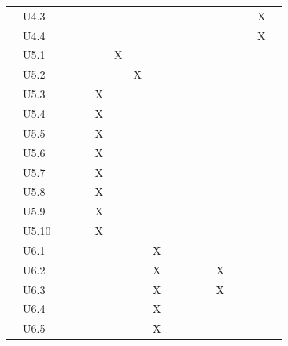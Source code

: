 \documentclass[hidelinks, 12pt, a4paper]{article}
\begin{document}
\begin{table}[H]
\begin{tabular}{|l|l|l|c|c|c|c|c|c|c|c|c|c|c|c|c|c|c|}
             & U4.3  &    &    &    &    &    &    &    &    &    &     &     &     &     &     & X   \\ \cline{2-17}
             & U4.4  &    &    &    &    &    &    &    &    &    &     &     &     &     &     & X   \\ \cline{2-17}
             & U5.1  &    &    &    &    & X  &    &    &    &    &     &     &     &     &     &     \\ \cline{2-17}
             & U5.2  &    &    &    &    &    & X  &    &    &    &     &     &     &     &     &     \\ \cline{2-17}
             & U5.3  &    &    &    & X  &    &    &    &    &    &     &     &     &     &     &     \\ \cline{2-17}
             & U5.4  &    &    &    & X  &    &    &    &    &    &     &     &     &     &     &     \\ \cline{2-17}
             & U5.5  &    &    &    & X  &    &    &    &    &    &     &     &     &     &     &     \\ \cline{2-17}
             & U5.6  &    &    &    & X  &    &    &    &    &    &     &     &     &     &     &     \\ \cline{2-17}
             & U5.7  &    &    &    & X  &    &    &    &    &    &     &     &     &     &     &     \\ \cline{2-17}
             & U5.8  &    &    &    & X  &    &    &    &    &    &     &     &     &     &     &     \\ \cline{2-17}
             & U5.9  &    &    &    & X  &    &    &    &    &    &     &     &     &     &     &     \\ \cline{2-17}
             & U5.10 &    &    &    & X  &    &    &    &    &    &     &     &     &     &     &     \\ \cline{2-17}
             & U6.1  &    &    &    &    &    &    & X  &    &    &     &     &     &     &     &     \\ \cline{2-17}
             & U6.2  &    &    &    &    &    &    & X  &    &    &     &     & X   &     &     &     \\ \cline{2-17}
             & U6.3  &    &    &    &    &    &    & X  &    &    &     &     & X   &     &     &     \\ \cline{2-17}
             & U6.4  &    &    &    &    &    &    & X  &    &    &     &     &     &     &     &     \\ \cline{2-17}
             & U6.5  &    &    &    &    &    &    & X  &    &    &     &     &     &     &     &     \\ \cline{2-17}

\end{tabular}
\end{table}
\end{document}
